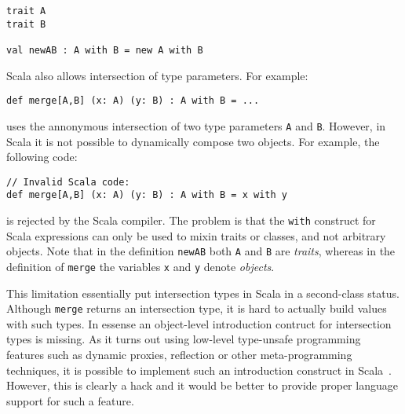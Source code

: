 \begin{lstlisting}
trait A
trait B

val newAB : A with B = new A with B
\end{lstlisting}

\noindent Scala also allows intersection of type parameters. For example:
\begin{lstlisting}
def merge[A,B] (x: A) (y: B) : A with B = ...
\end{lstlisting}
uses the annonymous intersection of two type parameters \lstinline{A} and
\lstinline{B}. However, in Scala it is not possible to dynamically
compose two objects. For example, the following code:

\begin{lstlisting}
// Invalid Scala code:
def merge[A,B] (x: A) (y: B) : A with B = x with y
\end{lstlisting}

\noindent is rejected by the Scala compiler. The problem is that the
\lstinline{with} construct for Scala expressions can only be used to
mixin traits or classes, and not arbitrary objects. Note that in the
definition \lstinline{newAB} both \lstinline{A} and \lstinline{B} are
\emph{traits}, whereas in the definition of \lstinline{merge} the variables
\lstinline{x} and \lstinline{y} denote \emph{objects}.

\begin{comment}
A common limitation in those languages, though, is that there is no introduction
construct at the term level for intersection types. In Java and Scala, we cannot
create an instance of class type \lstinline{A & B} with
\begin{lstlisting}
  new A() & B()
\end{lstlisting}
\end{comment}

This limitation essentially put intersection types in Scala in a second-class
status. Although \lstinline{merge} returns an intersection type, it is
hard to actually build values with such types. In essense an
object-level introduction contruct for intersection types is missing.
As it turns out using low-level type-unsafe programming features such
as dynamic proxies, reflection or other meta-programming techniques,
it is possible to implement such an introduction
construct in Scala~\cite{oliveira2013feature,rendel14attributes}. However, this
is clearly a hack and it would be better to provide proper language
support for such a feature.

\begin{comment}
This is in
contrast, there are term-level introduction construct for function types (with
lambdas) and universal quantification (with big lambdas) in most core
calculi.
\end{comment}

